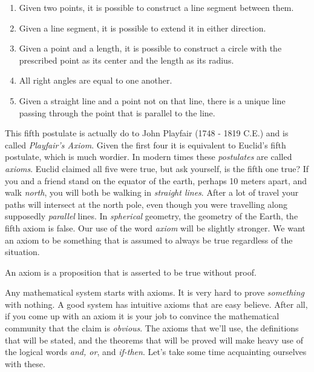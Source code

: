             \begin{enumerate}
                \item Given two points, it is possible to construct a line
                    segment between them.
                \item Given a line segment, it is possible to extend it in
                    either direction.
                \item Given a point and a length, it is possible to construct a
                    circle with the prescribed point as its center and the
                    length as its radius.
                \item All right angles are equal to one another.
                \item Given a straight line and a point not on that line,
                    there is a unique line passing through the point that is
                    parallel to the line.
            \end{enumerate}
            This fifth postulate is actually do to John Playfair%
            (1748 - 1819 C.E.) and is called \textit{Playfair's Axiom}. Given
            the first four it is equivalent to Euclid's fifth postulate, which
            is much wordier. In modern times these \textit{postulates} are
            called \textit{axioms}. Euclid claimed all five were true, but ask
            yourself, is the fifth one true? If you and a friend stand on the
            equator of the earth, perhaps 10 meters apart, and walk
            \textit{north}, you will both be walking in \textit{straight lines}.
            After a lot of travel your paths will intersect at the north pole,
            even though you were travelling along supposedly \textit{parallel}
            lines. In \textit{spherical} geometry, the geometry of the Earth,
            the fifth axiom is false. Our use of the word \textit{axiom}
            will be slightly
            stronger. We want an axiom to be something that is assumed to
            always be true regardless of the situation.
            \begin{definition}
                An \gls{axiom} is a proposition that is asserted to be true
                without proof.
            \end{definition}
            Any mathematical system starts with axioms. It is very hard to prove
            \textit{something} with nothing. A good system has intuitive axioms
            that are easy believe. After all, if you come up with an axiom it
            is your job to convince the mathematical community that the claim
            is \textit{obvious}. The axioms that we'll use, the definitions
            that will be stated, and the theorems that will be proved will make
            heavy use of the logical words \textit{and, or}, and
            \textit{if-then}. Let's take some time acquainting ourselves with
            these.
